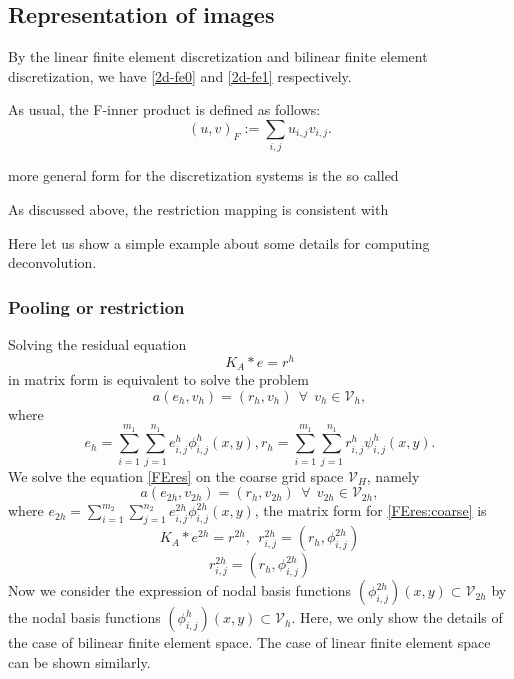 

\subsection{Representation of images}

By the linear finite element discretization and bilinear finite element discretization, 
we have \eqref{2d-fe0} and \eqref{2d-fe1} respectively. 

As usual, the F-inner product is defined as follows:
$$
(u, v)_F := \sum_{i,j} u_{i,j}v_{i,j}.
$$

more general form for the discretization systems  is the so 
called


As discussed above, the restriction mapping is consistent with

Here let us show a simple example about some details for computing deconvolution. 

\subsubsection{Pooling or restriction}\label{sec:cnn-restriction}
Solving the residual equation 
$$
K_A\ast e=r^h
$$
in matrix form is equivalent to solve the problem 
\begin{equation}\label{FEres}
a(e_h, v_h)=(r_h,v_h)~~\forall~~v_h\in \mathcal V_h,
\end{equation}
where 
\begin{equation}\label{expresion:residual}
e_h=\sum_{i=1}^{m_1}\sum_{j=1}^{n_1}e^h_{i,j}\phi^h_{i,j}(x,y), r_h=\sum_{i=1}^{m_1}\sum_{j=1}^{n_1}r^h_{i,j}\psi^h_{i,j}(x,y).
\end{equation}
We solve the equation \eqref{FEres} on the coarse grid space $\mathcal V_H$, namely 
\begin{equation}\label{FEres:coarse}
a(e_{2h}, v_{2h})=(r_h,v_{2h})~~\forall~~v_{2h}\in \mathcal V_{2h},
\end{equation}
where $e_{2h}=\sum_{i=1}^{m_2}\sum_{j=1}^{n_2}e^{2h}_{i,j}\phi^{2h}_{i,j}(x,y)$, the matrix form for \eqref{FEres:coarse} is 
\begin{equation}\label{coarse:matrix}
K_A\ast e^{2h}=r^{2h},~~r_{i,j}^{2h}=(r_h,\phi^{2h}_{i,j})
\end{equation}
\begin{equation}\label{restriction}
r_{i,j}^{2h}=(r_h,\phi^{2h}_{i,j})
\end{equation}
Now we consider the expression of nodal basis functions $(\phi_{i,j}^{2h})(x,y)\subset \mathcal V_{2h}$ by the nodal basis functions $(\phi_{i,j}^{h})(x,y)\subset \mathcal V_{h}$. Here, we only show the details of the case of bilinear finite element space.  The case of linear finite element space can be shown similarly.

